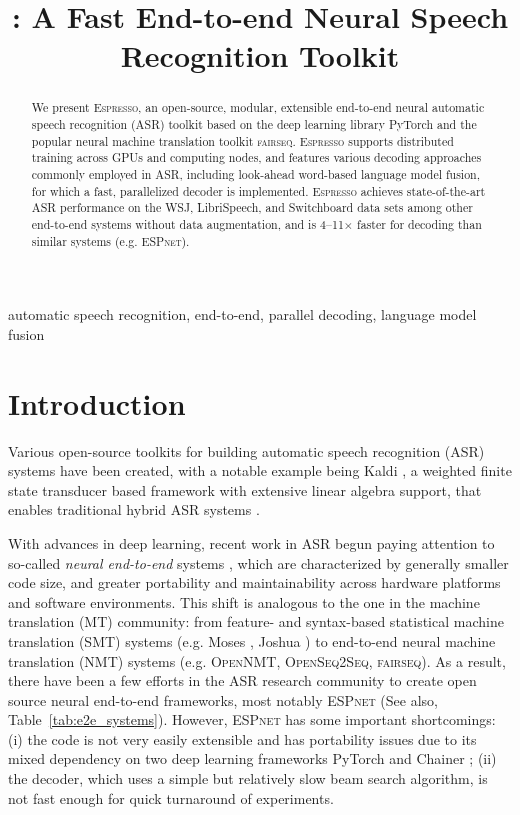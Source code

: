 \documentclass{article}
\title{\espresso: A Fast End-to-end Neural Speech Recognition Toolkit}
\def\espresso{\textsc{Espresso}\xspace}
\def\fairseq{\textsc{fairseq}\xspace}
\def\opennmt{\textsc{OpenNMT}\xspace}
\def\openseqseq{\textsc{OpenSeq2Seq}\xspace}
\def\espnet{\textsc{ESPnet}\xspace}
\begin{document}
\ninept

\maketitle
\begin{abstract}
  We present \espresso, an open-source, modular, extensible end-to-end neural automatic speech recognition (ASR) toolkit based on the deep learning library PyTorch and the popular neural machine translation toolkit \fairseq. \espresso supports distributed training across GPUs and computing nodes, and features various decoding approaches commonly employed in ASR, including look-ahead word-based language model fusion, for which a fast, parallelized decoder is implemented. \espresso achieves state-of-the-art ASR performance on the WSJ, LibriSpeech, and Switchboard data sets among other end-to-end systems without data augmentation, and is 4--11$\times$ faster for decoding than similar systems (e.g. \espnet).
\end{abstract}

\begin{keywords}
automatic speech recognition, end-to-end, parallel decoding, language model fusion
\end{keywords}

\section{Introduction}
\label{sec:intro}
Various open-source toolkits for building automatic speech recognition (ASR) systems have been created, with a notable example being Kaldi \cite{povey2011kaldi}, a weighted finite state transducer based framework with extensive linear algebra support, that enables traditional hybrid ASR systems \cite{yu2014automatic}.

With advances in deep learning, recent work in ASR begun paying attention to so-called \emph{neural end-to-end} systems \cite[\emph{inter alia}]{graves2014towards,chorowski2014end,chan2016listen}, which are characterized by generally smaller code size, and greater portability and maintainability across hardware platforms and software environments. This shift is analogous to the one in the machine translation (MT) community: from feature- and syntax-based statistical machine translation (SMT) systems (e.g. Moses \cite{koehn2007moses}, Joshua \cite{li2009joshua}) to end-to-end neural machine translation (NMT) systems (e.g. \opennmt \cite{klein2017opennmt}, \openseqseq \cite{openseq2seq}, \fairseq \cite{ott2019fairseq}). As a result, there have been a few efforts in the ASR research community to create open source neural end-to-end  frameworks, most notably \espnet \cite{watanabe2018espnet} (See also, Table~\ref{tab:e2e_systems}). However, \espnet has some important shortcomings: (i) the code is not very easily extensible and has portability issues due to its mixed dependency on two deep learning frameworks PyTorch \cite{paszke2017automatic} and Chainer \cite{seiya2015chainer}; (ii) the decoder, which uses a simple but relatively slow beam search algorithm, is not fast enough for quick turnaround of experiments.
\end{document}
